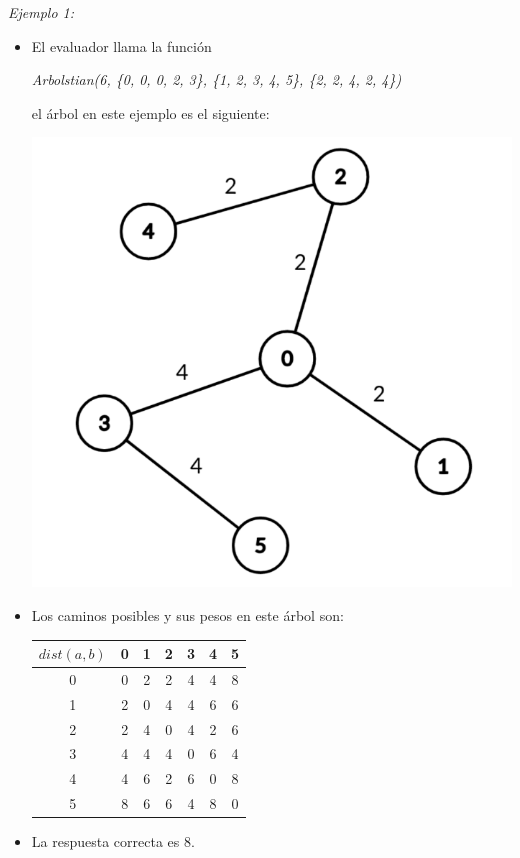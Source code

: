 \documentclass[12pt]{scrartcl}
\begin{document}
        {\itshape Ejemplo 1:}
        \begin{itemize}
            \item El evaluador llama la función 
            \begin{center}
                \textit{Arbolstian(6, \{0, 0, 0, 2, 3\}, \{1, 2, 3, 4, 5\}, \{2, 2, 4, 2, 4\})}
            \end{center}
            el árbol en este ejemplo es el siguiente:
            
            \begin{center}
                \includegraphics[scale=0.2]{ej1.png}
            \end{center}
            \item Los caminos posibles y sus pesos en este árbol son:
            \begin{center}
                \begin{tabular}{|c||c|c|c|c|c|c|}
                    \hline
                     $dist(a, b)$ & 0 & 1 & 2 & 3 & 4 & 5 \\
                     \hline
                     \hline
                     0 & 0 & 2 & 2 & 4 & 4 & 8 \\
                     \hline
                     1 & 2 & 0 & 4 & 4 & 6 & 6 \\
                     \hline
                     2 & 2 & 4 & 0 & 4 & 2 & 6 \\
                     \hline
                     3 & 4 & 4 & 4 & 0 & 6 & 4 \\
                     \hline
                     4 & 4 & 6 & 2 & 6 & 0 & 8 \\
                     \hline
                     5 & 8 & 6 & 6 & 4 & 8 & 0 \\ 
                     \hline
                \end{tabular}
            \end{center}
            \item La respuesta correcta es $8$.
        \end{itemize}
\end{document}
